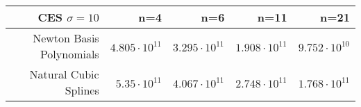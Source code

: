 \documentclass[]{article}
\begin{document}
\begin{longtable}[]{@{}rrrrr@{}}
\toprule
\begin{minipage}[b]{0.24\columnwidth}\raggedleft
CES \(\sigma = 10\)\strut
\end{minipage} & \begin{minipage}[b]{0.15\columnwidth}\raggedleft
n=4\strut
\end{minipage} & \begin{minipage}[b]{0.15\columnwidth}\raggedleft
n=6\strut
\end{minipage} & \begin{minipage}[b]{0.15\columnwidth}\raggedleft
n=11\strut
\end{minipage} & \begin{minipage}[b]{0.15\columnwidth}\raggedleft
n=21\strut
\end{minipage}\tabularnewline
\midrule
\endhead
\begin{minipage}[t]{0.24\columnwidth}\raggedleft
Newton Basis Polynomials\strut
\end{minipage} & \begin{minipage}[t]{0.15\columnwidth}\raggedleft
\(4.805 \cdot 10^{11}\)\strut
\end{minipage} & \begin{minipage}[t]{0.15\columnwidth}\raggedleft
\(3.295 \cdot 10^{11}\)\strut
\end{minipage} & \begin{minipage}[t]{0.15\columnwidth}\raggedleft
\(1.908 \cdot 10^{11}\)\strut
\end{minipage} & \begin{minipage}[t]{0.15\columnwidth}\raggedleft
\(9.752 \cdot 10^{10}\)\strut
\end{minipage}\tabularnewline
\begin{minipage}[t]{0.24\columnwidth}\raggedleft
Natural Cubic Splines\strut
\end{minipage} & \begin{minipage}[t]{0.15\columnwidth}\raggedleft
\(5.35 \cdot 10^{11}\)\strut
\end{minipage} & \begin{minipage}[t]{0.15\columnwidth}\raggedleft
\(4.067 \cdot 10^{11}\)\strut
\end{minipage} & \begin{minipage}[t]{0.15\columnwidth}\raggedleft
\(2.748 \cdot 10^{11}\)\strut
\end{minipage} & \begin{minipage}[t]{0.15\columnwidth}\raggedleft
\(1.768 \cdot 10^{11}\)\strut

\end{minipage}
\end{longtable}
\end{document}
